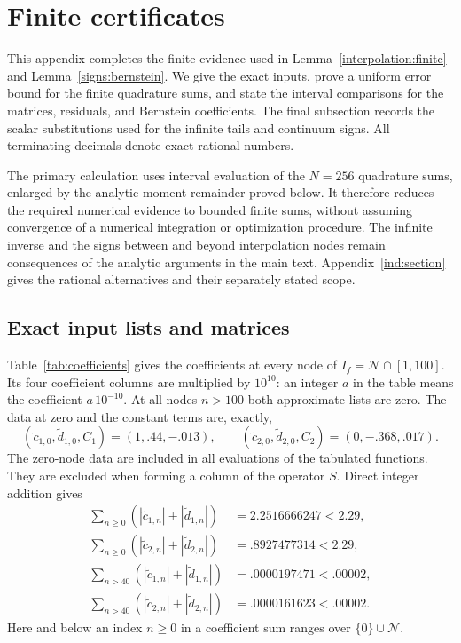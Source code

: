 \section{Finite certificates}\label{sec:certificates}

This appendix completes the finite evidence used in
Lemma~\ref{interpolation:finite} and Lemma~\ref{signs:bernstein}.
We give the exact inputs, prove a uniform error bound for the finite
quadrature sums, and state the interval comparisons for the matrices,
residuals, and Bernstein coefficients.  The final subsection records the
scalar substitutions used for the infinite tails and continuum signs.
All terminating decimals denote exact rational numbers.

The primary calculation uses interval evaluation of the $N=256$ quadrature
sums, enlarged by the analytic moment remainder proved below.  It therefore
reduces the required numerical evidence to bounded finite sums, without
assuming convergence of a numerical integration or optimization procedure.
The infinite inverse and the signs between and beyond interpolation nodes
remain consequences of the analytic arguments in the main text.
Appendix~\ref{ind:section} gives the rational alternatives and their
separately stated scope.

\subsection{Exact input lists and matrices}\label{cert:inputs}

Table~\ref{tab:coefficients} gives the coefficients at every node of
$I_f=\mathcal N\cap[1,100]$.  Its four coefficient columns are multiplied
by $10^{10}$: an integer $a$ in the table means the coefficient
$a\,10^{-10}$.  At all nodes $n>100$ both approximate lists are zero.
The data at zero and the constant terms are, exactly,
\begin{equation}\label{cert:fixed-inputs}
 (\widetilde c_{1,0},\widetilde d_{1,0},C_1)
   =(1,.44,-.013),\qquad
 (\widetilde c_{2,0},\widetilde d_{2,0},C_2)
   =(0,-.368,.017).
\end{equation}
The zero-node data are included in all evaluations of the tabulated functions.
They are excluded when forming a column of the operator $S$.
Direct integer addition gives
\begin{equation}\label{cert:table-norms}
\begin{aligned}
 \sum_{n\ge0}(|\widetilde c_{1,n}|+|\widetilde d_{1,n}|)
   &=2.2516666247<2.29,\\
 \sum_{n\ge0}(|\widetilde c_{2,n}|+|\widetilde d_{2,n}|)
   &=.8927477314<2.29,\\
 \sum_{n>40}(|\widetilde c_{1,n}|+|\widetilde d_{1,n}|)
   &=.0000197471<.00002,\\
 \sum_{n>40}(|\widetilde c_{2,n}|+|\widetilde d_{2,n}|)
   &=.0000161623<.00002.
\end{aligned}
\end{equation}
Here and below an index $n\ge0$ in a coefficient sum ranges over
$\{0\}\cup\mathcal N$.

